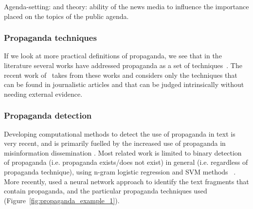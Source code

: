Agenda-setting: \cite{Cohen_1964} and \cite{mccombs1972agenda} theory: ability of the news media to influence the importance placed on the topics of the public agenda.

\subsubsection{Propaganda techniques}

If we look at more practical definitions of propaganda, we see that in the literature several works have addressed propaganda as a set of techniques~\citep{torok2015symbiotic,miller1939techniques,weston2018rulebook}. The recent work of~\citet{da2019fine} takes from these works and considers only the techniques that can be found in journalistic articles and that can be judged intrinsically without needing external evidence.



\subsubsection{Propaganda detection}
\label{ssec:lit_propaganda_detection}




Developing computational methods to detect the use of propaganda in text is very recent, and is primarily fuelled by the increased use of propaganda in misinformation dissemination \cite{da2020survey}. Most related work is limited to binary detection of propaganda (i.e. propaganda exists/does not exist) in general (i.e. regardless of propaganda technique), using n-gram logistic regression and SVM methods ~\cite{rashkin2017truth,barron2019proppy}. More recently, \citet{da2019fine} used a neural network approach to identify the text fragments that contain propaganda, and the particular propaganda techniques used (Figure~\ref{fig:propaganda_example_1}).


